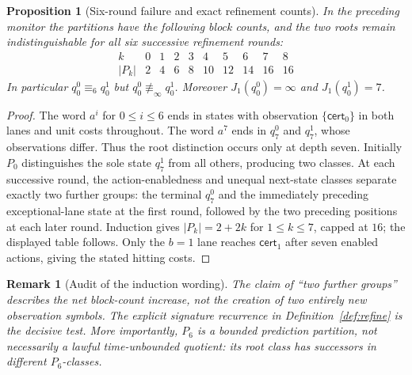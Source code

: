 \documentclass[11pt,letterpaper]{article}
\newtheorem{proposition}[theorem]{Proposition}
\newtheorem{remark}[theorem]{Remark}
\newcommand{\Cert}{\mathsf{cert}}
\newcommand{\Rinf}{\equiv_{\!\infty}}
\newcommand{\Rk}[1]{\equiv_{\!#1}}
\begin{document}
\begin{proposition}[Six-round failure and exact refinement counts]\label{prop:delay}
In the preceding monitor the partitions have the following block counts, and the two roots remain indistinguishable for all six successive refinement rounds:
\[
\begin{array}{c|rrrrrrrrr}
 k&0&1&2&3&4&5&6&7&8\\\hline
 |P_k|&2&4&6&8&10&12&14&16&16
\end{array}
\]
In particular $q_0^0\Rk{6}q_0^1$ but $q_0^0\not\Rinf q_0^1$. Moreover $J_1(q_0^0)=\infty$ and $J_1(q_0^1)=7$.
\end{proposition}
\begin{proof}
The word $a^i$ for $0\le i\le6$ ends in states with observation $\{\Cert_0\}$ in both lanes and unit costs throughout. The word $a^7$ ends in $q_7^0$ and $q_7^1$, whose observations differ. Thus the root distinction occurs only at depth seven. Initially $P_0$ distinguishes the sole state $q_7^1$ from all others, producing two classes. At each successive round, the action-enabledness and unequal next-state classes separate exactly two further groups: the terminal $q_7^0$ and the immediately preceding exceptional-lane state at the first round, followed by the two preceding positions at each later round. Induction gives $|P_k|=2+2k$ for $1\le k\le7$, capped at $16$; the displayed table follows. Only the $b=1$ lane reaches $\Cert_1$ after seven enabled actions, giving the stated hitting costs.
\end{proof}
\begin{remark}[Audit of the induction wording]
The claim of ``two further groups'' describes the net block-count increase, not the creation of two entirely new observation symbols. The explicit signature recurrence in Definition~\ref{def:refine} is the decisive test. More importantly, $P_6$ is a \emph{bounded prediction partition}, not necessarily a lawful time-unbounded quotient: its root class has successors in different $P_6$-classes.
\end{remark}
\end{document}
